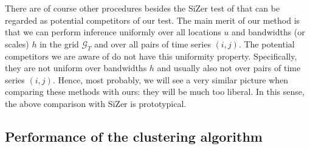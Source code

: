 \documentclass[12pt]{article}
\begin{document}
There are of course other procedures besides the SiZer test of \cite{Park2009} that can be regarded as potential competitors of our test. The main merit of our method is that we can perform inference uniformly over all locations $u$ and bandwidths (or scales) $h$ in the grid $\mathcal{G}_T$ and over all pairs of time series $(i,j)$. The potential competitors we are aware of do not have this uniformity property. Specifically, they are not uniform over bandwidths $h$ and usually also not over pairs of time series $(i,j)$. Hence, most probably, we will see a very similar picture when comparing these methods with ours: they will be much too liberal. In this sense, the above comparison with SiZer is prototypical. 


\subsection{Performance of the clustering algorithm}\label{subsec:sim:clustering}
\end{document}

